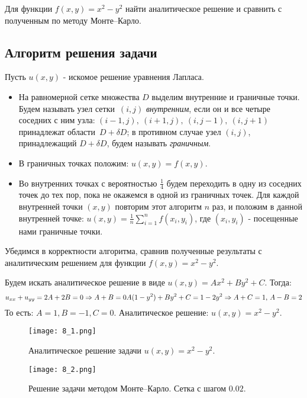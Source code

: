 \documentclass[a4paper, 11pt]{article}
\theoremstyle{def}
\theoremstyle{th}
\theoremstyle{rem}
\begin{document}
Для функции $f(x,y)=x^2-y^2$ найти аналитическое решение и сравнить с полученным по методу Монте--Карло.

\subsection{Алгоритм решения задачи}
Пусть $u(x, y)$ - искомое решение уравнения Лапласа.
\begin{itemize}
    \item На равномерной сетке множества $D$ выделим внутренние и граничные точки. Будем называть узел сетки~$(i, j)$ \textit{внутренним}, если он и все четыре соседних с ним узла: $(i-1, j), \ (i + 1, j), \ (i, j - 1), \ (i, j + 1)$ принадлежат области~$D + \delta D$; в противном случае узел $(i, j)$, принадлежащий $D + \delta D$, будем называть \textit{граничным}.
    \item В граничных точках положим: $u(x, y) = f(x, y)$.
    \item Во внутренних точках с вероятностью $\frac{1}{4}$ будем переходить в одну из соседних точек до тех пор, пока не окажемся в одной из граничных точек. Для каждой внутренней точки $(x, y)$ повторим этот алгоритм $n$ раз, и положим в данной внутренней точке: $u(x, y) = \frac{1}{n}\sum\limits_{i=1}^n f(x_i, y_i)$, где $(x_i, y_i)$ - посещенные нами граничные точки.
\end{itemize}

Убедимся в корректности алгоритма, сравнив полученные результаты с аналитическим решением для функции $f(x, y) = x^2 - y^2$.

Будем искать аналитическое решение в виде $u(x, y) = Ax^2 + By^2 + C.$ Тогда:
$$
u_{xx} + u_{yy} = 2A + 2B = 0 \Rightarrow A + B = 0\\
A(1 - y^2) + B y^2 + C = 1 - 2y^2 \Rightarrow A + C = 1,\, A-B = 2
$$
То есть: $A = 1, B = -1, C = 0.$ Аналитическое решение: $u(x, y) = x^2 - y^2.$

\begin{figure}[H]
        \noindent
        \centering
        {
                \texttt{[image: 8\_1.png]}
        }
        \caption{Аналитическое решение задачи $u(x, y) = x^2 - y^2.$}
\end{figure}
\begin{figure}[H]
        \noindent
        \centering
        {
                \texttt{[image: 8\_2.png]}
        }
        \caption{Решение задачи методом Монте--Карло. Сетка с шагом $0.02$.}
\end{figure}
\end{document}
